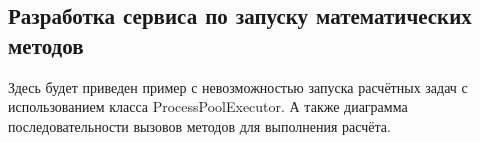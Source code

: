 \subsection{\large{Разработка сервиса по запуску математических методов}}

Здесь будет приведен пример с невозможностью запуска расчётных задач с использованием
класса ProcessPoolExecutor. А также диаграмма последовательности вызовов методов для
выполнения расчёта.